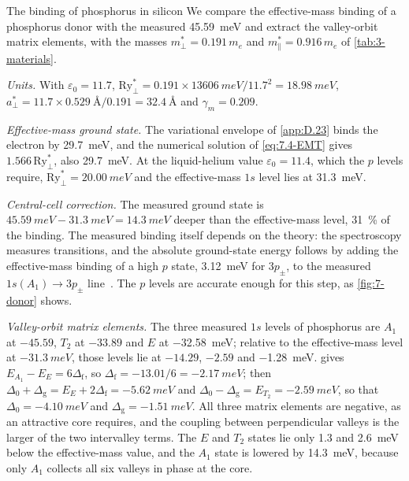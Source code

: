 \begin{workedexample}{The binding of phosphorus in silicon}\label{we:7-sip}
We compare the effective-mass binding of a phosphorus donor with the measured \SI{45.59}{meV} and extract the valley-orbit matrix elements, with the masses $m^*_\perp = 0.191\,m_e$ and $m^*_\parallel = 0.916\,m_e$ of \cref{tab:3-materials}.

\emph{Units.} With $\varepsilon_0 = 11.7$, $\mathrm{Ry}^*_\perp = 0.191\times\SI{13606}{meV}/11.7^2 = \SI{18.98}{meV}$, $a^*_\perp = 11.7\times\SI{0.529}{\angstrom}/0.191 = \SI{32.4}{\angstrom}$ and $\gamma_m = 0.209$.

\emph{Effective-mass ground state.} The variational envelope of \cref{app:D.23} binds the electron by \SI{29.7}{meV}, and the numerical solution of \cref{eq:7.4-EMT} gives $1.566\,\mathrm{Ry}^*_\perp$, also \SI{29.7}{meV}. At the liquid-helium value $\varepsilon_0 = 11.4$, which the $p$ levels require, $\mathrm{Ry}^*_\perp = \SI{20.00}{meV}$ and the effective-mass $1s$ level lies at \SI{31.3}{meV}.

\emph{Central-cell correction.} The measured ground state is $\SI{45.59}{meV} - \SI{31.3}{meV} = \SI{14.3}{meV}$ deeper than the effective-mass level, \SI{31}{\percent} of the binding. The measured binding itself depends on the theory: the spectroscopy measures transitions, and the absolute ground-state energy follows by adding the effective-mass binding of a high $p$ state, \SI{3.12}{meV} for $3p_\pm$, to the measured $1s(A_1) \to 3p_\pm$ line~\cite{smith2017ab}. The $p$ levels are accurate enough for this step, as \cref{fig:7-donor} shows.

\emph{Valley-orbit matrix elements.} The three measured $1s$ levels of phosphorus are $A_1$ at $-45.59$, $T_2$ at $-33.89$ and $E$ at \SI{-32.58}{meV}; relative to the effective-mass level at $-\SI{31.3}{meV}$, those levels lie at $-14.29$, $-2.59$ and \SI{-1.28}{meV}.  gives $E_{A_1} - E_E = 6\Delta_{\mathrm{f}}$, so $\Delta_{\mathrm{f}} = -13.01/6 = \SI{-2.17}{meV}$; then $\Delta_0 + \Delta_{\mathrm{g}} = E_E + 2\Delta_{\mathrm{f}} = \SI{-5.62}{meV}$ and $\Delta_0 - \Delta_{\mathrm{g}} = E_{T_2} = \SI{-2.59}{meV}$, so that $\Delta_0 = \SI{-4.10}{meV}$ and $\Delta_{\mathrm{g}} = \SI{-1.51}{meV}$. All three matrix elements are negative, as an attractive core requires, and the coupling between perpendicular valleys is the larger of the two intervalley terms. The $E$ and $T_2$ states lie only 1.3 and \SI{2.6}{meV} below the effective-mass value, and the $A_1$ state is lowered by \SI{14.3}{meV}, because only $A_1$ collects all six valleys in phase at the core.


\end{workedexample}
